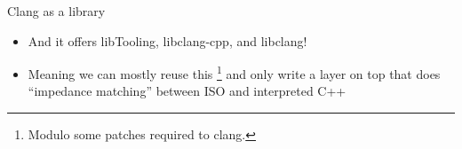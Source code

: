 \begin{frame}{Clang as a library}
  \begin{itemize}
    \itemsep=1ex

  \item And it offers libTooling, libclang-cpp, and libclang!

  \item Meaning we can mostly reuse this%
    \footnote{Modulo some patches required to clang.}%
    and only write a layer on top that does ``impedance matching'' between ISO and interpreted C++
  \end{itemize}
\end{frame}
